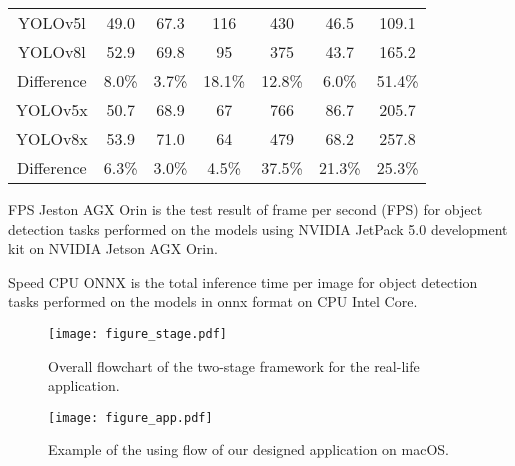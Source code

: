 \documentclass[default,iicol]{sn-jnl}
\theoremstyle{thmstyleone}\newtheorem{theorem}{Theorem}\newtheorem{proposition}[theorem]{Proposition}
\theoremstyle{thmstyletwo}\newtheorem{example}{Example}\newtheorem{remark}{Remark}\theoremstyle{thmstylethree}\newtheorem{definition}{Definition}
\begin{document}
\begin{table*}[]
{\begin{tabular}{ccccccc}
YOLOv5l & 49.0 & 67.3 & 116 & 430 & 46.5 & 109.1 \\
YOLOv8l & 52.9 & 69.8 & 95 & 375 & 43.7 & 165.2 \\
Difference & {\color{red}8.0\%} & {\color{red}3.7\%} & {\color{red}18.1\%} & {\color{red}12.8\%} & {\color{red}6.0\%} & {\color{blue}51.4\%} \\ \hline
YOLOv5x & 50.7 & 68.9 & 67 & 766 & 86.7 & 205.7 \\
YOLOv8x & 53.9 & 71.0 & 64 & 479 & 68.2 & 257.8 \\
Difference & {\color{red}6.3\%} & {\color{red}3.0\%} & {\color{red}4.5\%} & {\color{red}37.5\%} & {\color{red}21.3\%} & {\color{blue}25.3\%} \\ \hline
\end{tabular}}
\begin{tablenotes}
\footnotesize
\item[]
FPS Jeston AGX Orin is the test result of frame per second (FPS) for object detection tasks performed on the models using NVIDIA JetPack 5.0 development kit on NVIDIA Jetson AGX Orin.
\item[]
Speed CPU ONNX is the total inference time per image for object detection tasks performed on the models in onnx format on CPU Intel Core.
\end{tablenotes}
\end{table*}

\begin{figure*}[h]
  \centering
  \texttt{[image: figure\_stage.pdf]}
  \caption{Overall flowchart of the two-stage framework for the real-life application.}
  \label{fig_stage}
\end{figure*}

\begin{figure*}[h]
  \centering
  \texttt{[image: figure\_app.pdf]}
  \caption{Example of the using flow of our designed application on macOS.}
  \label{fig_app}
\end{figure*}
\end{document}
